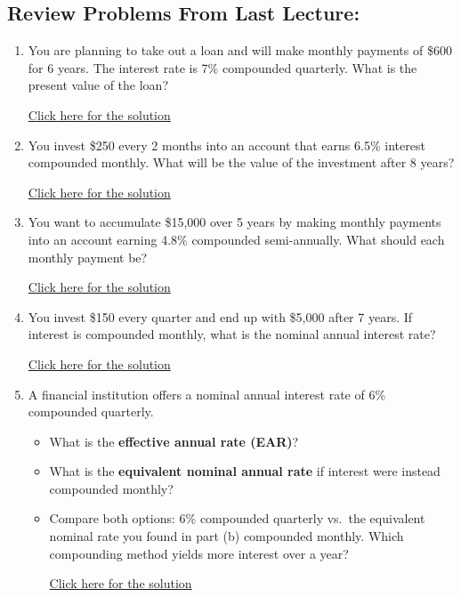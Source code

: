 \documentclass[
]{book}
\providecommand{\tightlist}{%
  \setlength{\itemsep}{0pt}\setlength{\parskip}{0pt}}
\begin{document}
\subsection*{Review Problems From Last Lecture:}\label{review-problems-from-last-lecture-14}

\begin{enumerate}
\def\labelenumi{\arabic{enumi}.}
\tightlist
\item
  You are planning to take out a loan and will make monthly payments of \$600 for 6 years. The interest rate is 7\% compounded quarterly. What is the present value of the loan?

  \href{https://youtu.be/LudOJKtJSTU}{Click here for the solution}
\item
  You invest \$250 every 2 months into an account that earns 6.5\% interest compounded monthly. What will be the value of the investment after 8 years?

  \href{https://youtu.be/rjgtfe-PjDs}{Click here for the solution}
\item
  You want to accumulate \$15,000 over 5 years by making monthly payments into an account earning 4.8\% compounded semi-annually. What should each monthly payment be?

  \href{https://youtu.be/__aieU0ELCs}{Click here for the solution}
\item
  You invest \$150 every quarter and end up with \$5,000 after 7 years. If interest is compounded monthly, what is the nominal annual interest rate?

  \href{https://youtu.be/as5FICA8nLQ}{Click here for the solution}
\item
  A financial institution offers a nominal annual interest rate of 6\% compounded quarterly.

  \begin{itemize}
  \tightlist
  \item
    What is the \textbf{effective annual rate (EAR)}?
  \item
    What is the \textbf{equivalent nominal annual rate} if interest were instead compounded monthly?
  \item
    Compare both options: 6\% compounded quarterly vs.~the equivalent nominal rate you found in part (b) compounded monthly. Which compounding method yields more interest over a year?

    \href{https://youtu.be/cNuDhyZxDnQ}{Click here for the solution}
  \end{itemize}
\end{enumerate}
\end{document}
